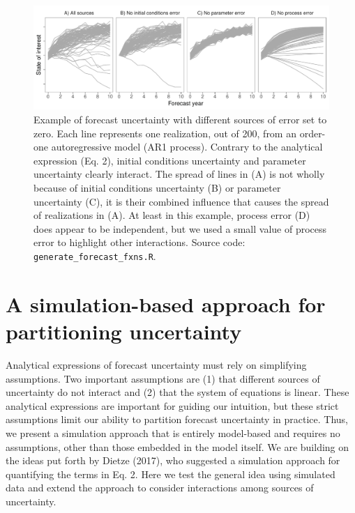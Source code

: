 \documentclass[12pt,]{article}
\begin{document}
\begin{figure}
\centering
\includegraphics{../figures/forecast_uncertainty_example.pdf}
\caption{Example of forecast uncertainty with different sources of error
set to zero. Each line represents one realization, out of 200, from an
order-one autoregressive model (AR1 process). Contrary to the analytical
expression (Eq. 2), initial conditions uncertainty and parameter
uncertainty clearly interact. The spread of lines in (A) is not wholly
because of initial conditions uncertainty (B) or parameter uncertainty
(C), it is their combined influence that causes the spread of
realizations in (A). At least in this example, process error (D) does
appear to be independent, but we used a small value of process error to
highlight other interactions. Source code:
\texttt{generate\_forecast\_fxns.R}.}
\end{figure}

\hypertarget{a-simulation-based-approach-for-partitioning-uncertainty}{%
\section{A simulation-based approach for partitioning
uncertainty}\label{a-simulation-based-approach-for-partitioning-uncertainty}}

Analytical expressions of forecast uncertainty must rely on simplifying
assumptions. Two important assumptions are (1) that different sources of
uncertainty do not interact and (2) that the system of equations is
linear. These analytical expressions are important for guiding our
intuition, but these strict assumptions limit our ability to partition
forecast uncertainty in practice. Thus, we present a simulation approach
that is entirely model-based and requires no assumptions, other than
those embedded in the model itself. We are building on the ideas put
forth by Dietze (2017), who suggested a simulation approach for
quantifying the terms in Eq. 2. Here we test the general idea using
simulated data and extend the approach to consider interactions among
sources of uncertainty.
\end{document}
